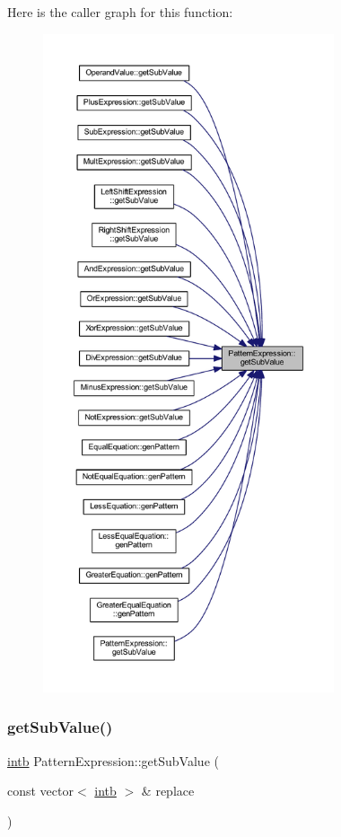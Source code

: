 Here is the caller graph for this function\+:
\nopagebreak
\begin{figure}[H]
\begin{center}
\leavevmode
\includegraphics[height=550pt]{class_pattern_expression_ade37db4aa76dd442b189bf4a6bb2d9dd_icgraph}
\end{center}
\end{figure}
\mbox{\label{class_pattern_expression_a0842ac84a9b84a426730ddaf1ef1e509}} 
\subsubsection{\texorpdfstring{getSubValue()}{getSubValue()}\hspace{0.1cm}{\footnotesize\ttfamily [2/2]}}
{\footnotesize\ttfamily \mbox{\hyperlink{types_8h_aa925ba3e627c2df89d5b1cfe84fb8572}{intb}} Pattern\+Expression\+::get\+Sub\+Value (\begin{DoxyParamCaption}\item[{const vector$<$ \mbox{\hyperlink{types_8h_aa925ba3e627c2df89d5b1cfe84fb8572}{intb}} $>$ \&}]{replace }\end{DoxyParamCaption})\hspace{0.3cm}{\ttfamily [inline]}}



